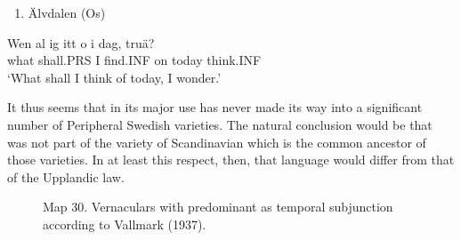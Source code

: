 \begin{enumerate} %
\item 
Älvdalen (Os)

\end{enumerate} %
\ea\label{}
\gll Wen  al  ig  itt  o  i dag,  truä?\\


what  shall.PRS  I  find.INF  on  today  think.INF\\ %


‘What shall I think of today, I wonder.’
\z


It thus seems that  in its major use has never made its way into a significant number of Peripheral Swedish varieties. The natural conclusion would be that  was not part of the variety of Scandinavian which is the common ancestor of those varieties. In at least this respect, then, that language would differ from that of the Upplandic law. 

\clearpage%



\begin{figure}[h]
\centering
\begin{minipage}{5.19792in}
\label{bkm:Ref264373686}Map 30. Vernaculars with predominant as temporal subjunction\newline
 according to Vallmark (1937).
\end{minipage}
\end{figure}
\clearpage%



